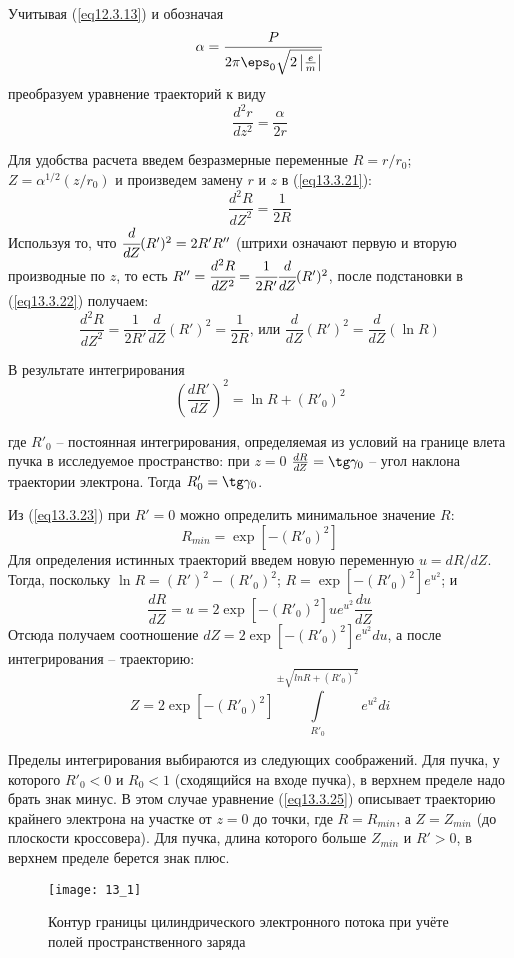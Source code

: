 Учитывая (\ref{eq12.3.13}) и обозначая 
\[
	\alpha = \frac{P}{2\pi\eps_0 \sqrt{2\left|\frac{e}{m}\right|}}
\]
преобразуем уравнение траекторий к виду
\begin{equation}
	\frac{d^2 r}{dz^2} = \frac{\alpha}{2r}
	\label{eq13.3.21}
\end{equation}
 
Для удобства расчета введем безразмерные переменные \( R = r/r_0 \); 
\( Z = \alpha^{1/2}(z/r_0) \) и произведем замену \( r \) и \( z \) в 
(\ref{eq13.3.21}):
\begin{equation}
	\frac{d^2 R}{dZ^2} = \frac{1}{2R}
	\label{eq13.3.22}
\end{equation}
Используя то, что \( \cfrac{d}{dZ}(R')^2 = 2R'R'' \) (штрихи означают первую 
и вторую производные по \( z \), то есть 
\( R'' = \cfrac{d^2 R}{dZ^2} = \cfrac{1}{2R'}\cfrac{d}{dZ}(R')^2 \), после 
подстановки в (\ref{eq13.3.22}) получаем:
\[
	\frac{d^2 R}{dZ^2} = \frac{1}{2R'}\frac{d}{dZ}(R')^2 = \frac{1}{2R}
	\text{, или } \frac{d}{dZ}(R')^2 = \frac{d}{dZ}(\ln R)
\]

В результате интегрирования
\begin{equation}
	\left( \frac{dR'}{dZ} \right)^2 = \ln R + (R'_0)^2
	\label{eq13.3.23}
\end{equation}
 
где \( R'_0 \) -- постоянная интегрирования, определяемая из условий на 
границе влета пучка в исследуемое пространство: при \( z = 0 \) 
\( \frac{dR}{dZ} = \tg\gamma_0 \) -- угол наклона траектории электрона. Тогда 
\( R'_0 = \tg\gamma_0 \).

Из (\ref{eq13.3.23}) при \( R' = 0 \) можно определить минимальное значение 
\( R \):
\begin{equation}
	R_{min} = \exp\left[ -(R'_0)^2 \right]
	\label{eq13.3.24}
\end{equation}
Для определения истинных траекторий введем новую переменную \( u = dR/dZ \).
Тогда, поскольку \( \ln R = (R')^2 - (R'_0)^2 \); 
\( R = \exp\left[ -(R'_0)^2 \right] e^{u^2} \); и 
\[
	\frac{dR}{dZ} = u = 2 \exp\left[ -(R'_0)^2 \right] ue^{u^2} \frac{du}{dZ}
\]
Отсюда получаем соотношение 
\( dZ = 2 \exp\left[ -(R'_0)^2 \right] e^{u^2} du \), а после интегрирования -- 
траекторию:
\begin{equation}
	Z = 2\exp\left[ -(R'_0)^2 \right] 
		\int\limits_{R'_0}^{\pm\sqrt{ln R+(R'_0)^2}} e^{u^2} di
	\label{eq13.3.25}
\end{equation}

Пределы интегрирования выбираются из следующих соображений. Для пучка, у 
которого \( R'_0 < 0 \) и \( R_0 < 1 \)  (сходящийся на входе пучка), в
верхнем пределе надо брать знак минус. В этом случае уравнение 
(\ref{eq13.3.25}) описывает траекторию крайнего электрона на участке от 
\( z = 0 \) до точки, где \( R = R_{min} \), а \( Z = Z_{min} \) (до плоскости 
кроссовера). Для пучка, длина которого больше  \( Z_{min} \) и \( R' > 0 \), в 
верхнем пределе берется знак плюс.
\begin{figure}[h!]
	\center
	\texttt{[image: 13\_1]}
	\caption{Контур границы цилиндрического 
		электронного потока при учёте полей пространственного заряда}
	\label{img13.1}
\end{figure}

